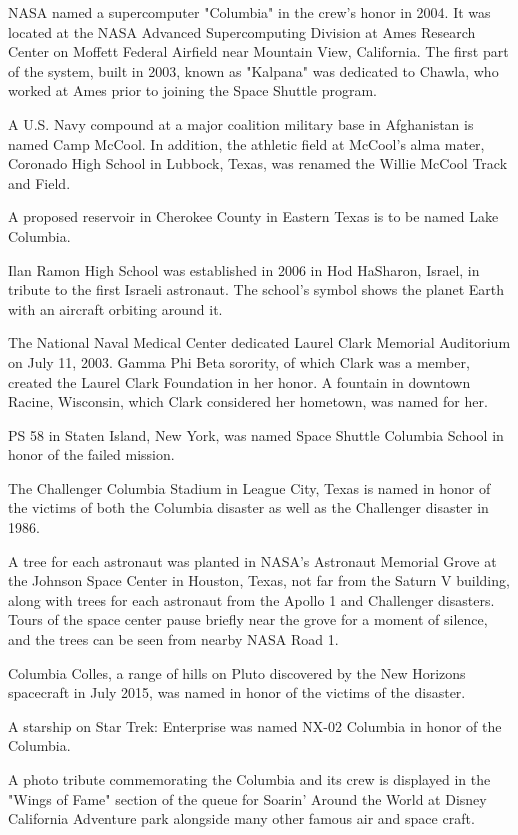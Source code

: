 NASA named a supercomputer "Columbia" in the crew's honor in 2004. It
was located at the NASA Advanced Supercomputing Division at Ames
Research Center on Moffett Federal Airfield near Mountain View,
California. The first part of the system, built in 2003, known as
"Kalpana" was dedicated to Chawla, who worked at Ames prior to joining
the Space Shuttle program.

A U.S. Navy compound at a major coalition military base in Afghanistan
is named Camp McCool. In addition, the athletic field at McCool's alma
mater, Coronado High School in Lubbock, Texas, was renamed the Willie
McCool Track and Field.

A proposed reservoir in Cherokee County in Eastern Texas is to be named
Lake Columbia.

Ilan Ramon High School was established in 2006 in Hod HaSharon, Israel,
in tribute to the first Israeli astronaut. The school's symbol shows the
planet Earth with an aircraft orbiting around it.

The National Naval Medical Center dedicated Laurel Clark Memorial
Auditorium on July 11, 2003. Gamma Phi Beta sorority, of which Clark was
a member, created the Laurel Clark Foundation in her honor. A fountain
in downtown Racine, Wisconsin, which Clark considered her hometown, was
named for her.

PS 58 in Staten Island, New York, was named Space Shuttle Columbia
School in honor of the failed mission.

The Challenger Columbia Stadium in League City, Texas is named in honor
of the victims of both the Columbia disaster as well as the Challenger
disaster in 1986.

A tree for each astronaut was planted in NASA's Astronaut Memorial Grove
at the Johnson Space Center in Houston, Texas, not far from the Saturn V
building, along with trees for each astronaut from the Apollo 1 and
Challenger disasters. Tours of the space center pause briefly near the
grove for a moment of silence, and the trees can be seen from nearby
NASA Road 1.

Columbia Colles, a range of hills on Pluto discovered by the New
Horizons spacecraft in July 2015, was named in honor of the victims of
the disaster.

A starship on Star Trek: Enterprise was named NX-02 Columbia in honor of
the Columbia.

A photo tribute commemorating the Columbia and its crew is displayed in
the "Wings of Fame" section of the queue for Soarin' Around the World at
Disney California Adventure park alongside many other famous air and
space craft.

